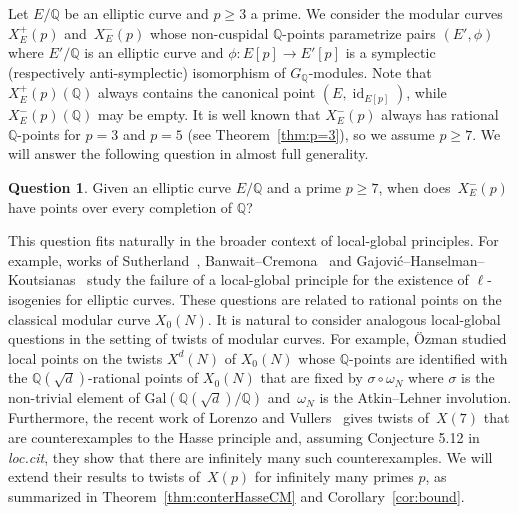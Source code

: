 \documentclass[12pt]{amsart}
\numberwithin{equation}{section}
\theoremstyle{definition}
\newtheorem{question}[equation]{Question}
\newcommand{\Q}{\mathbb{Q}}
\newcommand{\Xp}{X_E^{-}(p)}
\newcommand{\Gal}{\text{Gal}}
\DeclareMathOperator{\id}{id}
\begin{document}
Let $E/\Q$ be an elliptic curve and $p \geq 3$ a prime. We consider the modular curves
$X_E^+(p)$ and~$X^-_E(p)$ whose non-cuspidal $\Q$-points parametrize pairs $(E', \phi)$ where $E'/\Q$ is an elliptic curve and $\phi : E[p] \to E'[p]$ is a symplectic (respectively anti-symplectic) isomorphism of $G_\Q$-modules.
Note that $X_E^+(p)(\Q)$ always contains the canonical point $(E, \id_{E[p]})$, while $\Xp(\Q)$ may be empty. It is well known that $\Xp$ always has rational $\Q$-points for $p=3$ and $p=5$
(see Theorem~\ref{thm:p=3}), so we assume $p \geq 7$.
We will answer the following question in almost full generality.
\begin{question}\label{Q}
Given an elliptic curve $E/\mathbb{Q}$ and a prime $p\geq 7$, when does~$X_E^-(p)$ have points over every completion of $\mathbb{Q}$?
\end{question}

This question fits naturally in the broader context of 
local-global principles. For example, works of Sutherland~\cite{SutherlandLocalGlobal}, Banwait--Cremona~\cite{BanwaitCremona} and Gajovi\'c--Hanselman--Koutsianas~\cite{Gajovic}
study the failure of a local-global principle for the existence
of $\ell$-isogenies for elliptic curves. These questions are related to rational points on the classical
modular curve $X_0(N)$. It is natural to consider analogous local-global
questions in the setting of twists of modular curves. For example, \"Ozman \cite{ekin, ekin2} studied local points on the twists $X^d(N)$ of $X_0(N)$ whose $\Q$-points are identified with
the $\Q(\sqrt{d})$-rational points of $X_0(N)$ that are fixed by $\sigma \circ \omega_N$ where $\sigma$ is the non-trivial element of $\Gal(\Q(\sqrt{d})/ \Q)$ and~$\omega_N$ is the Atkin--Lehner involution. 
Furthermore, the recent work of Lorenzo and Vullers~\cite{LorVul} gives twists
of~$X(7)$ that are counterexamples to the Hasse principle and, assuming Conjecture 5.12 in {\it loc.cit}, they show that there are infinitely many such counterexamples. We will extend their results 
to twists of~$X(p)$ for infinitely many primes $p$, as summarized in Theorem~\ref{thm:conterHasseCM} and Corollary~\ref{cor:bound}. 
\end{document}
